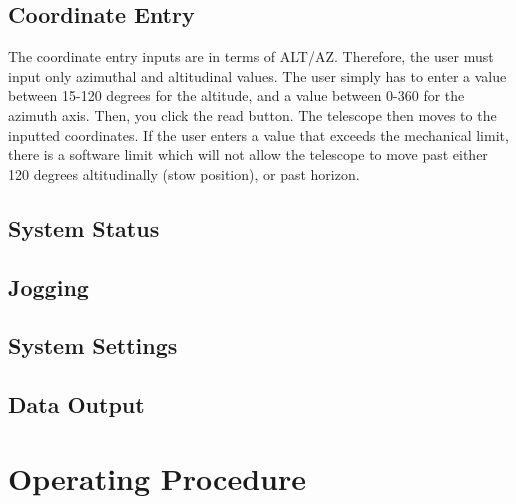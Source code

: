 \documentclass{article}
\begin{document}
\subsection{Coordinate Entry}

The coordinate entry inputs are in terms of ALT/AZ. Therefore, the user must input only azimuthal and altitudinal values. The user simply has to enter a value between 15-120 degrees for the altitude, and a value between 0-360 for the azimuth axis. Then, you click the read button. The telescope then moves to the inputted coordinates. If the user enters a value that exceeds the mechanical limit, there is a software limit which will not allow the telescope to move past either 120 degrees altitudinally (stow position), or past horizon.
\subsection{System Status}
\subsection{Jogging}
\subsection{System Settings}
\subsection{Data Output}

\section{Operating Procedure}
\end{document}
